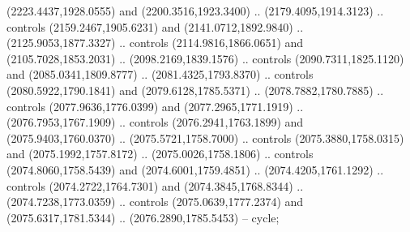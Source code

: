 \begin{scope}[shift={(19.44451,-318.97965)}]
\begin{scope}[shift={(-2093.8013,-1176.4989)}]
\begin{scope}
\begin{scope}
          (2223.4437,1928.0555) and (2200.3516,1923.3400) .. (2179.4095,1914.3123) ..
          controls (2159.2467,1905.6231) and (2141.0712,1892.9840) ..
          (2125.9053,1877.3327) .. controls (2114.9816,1866.0651) and
          (2105.7028,1853.2031) .. (2098.2169,1839.1576) .. controls
          (2090.7311,1825.1120) and (2085.0341,1809.8777) .. (2081.4325,1793.8370) ..
          controls (2080.5922,1790.1841) and (2079.6128,1785.5371) ..
          (2078.7882,1780.7885) .. controls (2077.9636,1776.0399) and
          (2077.2965,1771.1919) .. (2076.7953,1767.1909) .. controls
          (2076.2941,1763.1899) and (2075.9403,1760.0370) .. (2075.5721,1758.7000) ..
          controls (2075.3880,1758.0315) and (2075.1992,1757.8172) ..
          (2075.0026,1758.1806) .. controls (2074.8060,1758.5439) and
          (2074.6001,1759.4851) .. (2074.4205,1761.1292) .. controls
          (2074.2722,1764.7301) and (2074.3845,1768.8344) .. (2074.7238,1773.0359) ..
          controls (2075.0639,1777.2374) and (2075.6317,1781.5344) ..
          (2076.2890,1785.5453) -- cycle;


\end{scope}
\end{scope}
\end{scope}
\end{scope}
